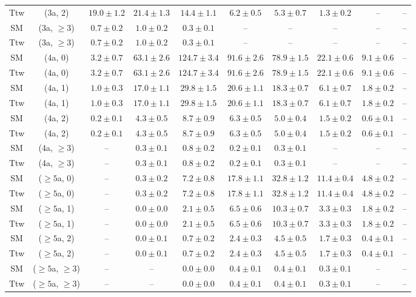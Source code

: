 \begin{table}[h!]
{\begin{tabular}{cccccccccc}
	Ttw & (3a, 2) & $19.0\pm 1.2$ & $21.4\pm 1.3$ & $14.4\pm 1.1$ & $6.2\pm 0.5$ & $5.3\pm 0.7$ & $1.3\pm 0.2$ & -- & -- \\[0.5ex] 
	SM & (3a, $\ge3$) & $0.7\pm 0.2$ & $1.0\pm 0.2$ & $0.3\pm 0.1$ & -- & -- & -- & -- & -- \\[0.5ex] 
	Ttw & (3a, $\ge3$) & $0.7\pm 0.2$ & $1.0\pm 0.2$ & $0.3\pm 0.1$ & -- & -- & -- & -- & -- \\[0.5ex] 
	SM & (4a, 0) & $3.2\pm 0.7$ & $63.1\pm 2.6$ & $124.7\pm 3.4$ & $91.6\pm 2.6$ & $78.9\pm 1.5$ & $22.1\pm 0.6$ & $9.1\pm 0.6$ & -- \\[0.5ex] 
	Ttw & (4a, 0) & $3.2\pm 0.7$ & $63.1\pm 2.6$ & $124.7\pm 3.4$ & $91.6\pm 2.6$ & $78.9\pm 1.5$ & $22.1\pm 0.6$ & $9.1\pm 0.6$ & -- \\[0.5ex] 
	SM & (4a, 1) & $1.0\pm 0.3$ & $17.0\pm 1.1$ & $29.8\pm 1.5$ & $20.6\pm 1.1$ & $18.3\pm 0.7$ & $6.1\pm 0.7$ & $1.8\pm 0.2$ & -- \\[0.5ex] 
	Ttw & (4a, 1) & $1.0\pm 0.3$ & $17.0\pm 1.1$ & $29.8\pm 1.5$ & $20.6\pm 1.1$ & $18.3\pm 0.7$ & $6.1\pm 0.7$ & $1.8\pm 0.2$ & -- \\[0.5ex] 
	SM & (4a, 2) & $0.2\pm 0.1$ & $4.3\pm 0.5$ & $8.7\pm 0.9$ & $6.3\pm 0.5$ & $5.0\pm 0.4$ & $1.5\pm 0.2$ & $0.6\pm 0.1$ & -- \\[0.5ex] 
	Ttw & (4a, 2) & $0.2\pm 0.1$ & $4.3\pm 0.5$ & $8.7\pm 0.9$ & $6.3\pm 0.5$ & $5.0\pm 0.4$ & $1.5\pm 0.2$ & $0.6\pm 0.1$ & -- \\[0.5ex] 
	SM & (4a, $\ge3$) & -- & $0.3\pm 0.1$ & $0.8\pm 0.2$ & $0.2\pm 0.1$ & $0.3\pm 0.1$ & -- & -- & -- \\[0.5ex] 
	Ttw & (4a, $\ge3$) & -- & $0.3\pm 0.1$ & $0.8\pm 0.2$ & $0.2\pm 0.1$ & $0.3\pm 0.1$ & -- & -- & -- \\[0.5ex] 
	SM & ($\ge5$a, 0) & -- & $0.3\pm 0.2$ & $7.2\pm 0.8$ & $17.8\pm 1.1$ & $32.8\pm 1.2$ & $11.4\pm 0.4$ & $4.8\pm 0.2$ & -- \\[0.5ex] 
	Ttw & ($\ge5$a, 0) & -- & $0.3\pm 0.2$ & $7.2\pm 0.8$ & $17.8\pm 1.1$ & $32.8\pm 1.2$ & $11.4\pm 0.4$ & $4.8\pm 0.2$ & -- \\[0.5ex] 
	SM & ($\ge5$a, 1) & -- & $0.0\pm 0.0$ & $2.1\pm 0.5$ & $6.5\pm 0.6$ & $10.3\pm 0.7$ & $3.3\pm 0.3$ & $1.8\pm 0.2$ & -- \\[0.5ex] 
	Ttw & ($\ge5$a, 1) & -- & $0.0\pm 0.0$ & $2.1\pm 0.5$ & $6.5\pm 0.6$ & $10.3\pm 0.7$ & $3.3\pm 0.3$ & $1.8\pm 0.2$ & -- \\[0.5ex] 
	SM & ($\ge5$a, 2) & -- & $0.0\pm 0.1$ & $0.7\pm 0.2$ & $2.4\pm 0.3$ & $4.5\pm 0.5$ & $1.7\pm 0.3$ & $0.4\pm 0.1$ & -- \\[0.5ex] 
	Ttw & ($\ge5$a, 2) & -- & $0.0\pm 0.1$ & $0.7\pm 0.2$ & $2.4\pm 0.3$ & $4.5\pm 0.5$ & $1.7\pm 0.3$ & $0.4\pm 0.1$ & -- \\[0.5ex] 
	SM & ($\ge5$a, $\ge3$) & -- & -- & $0.0\pm 0.0$ & $0.4\pm 0.1$ & $0.4\pm 0.1$ & $0.3\pm 0.1$ & -- & -- \\[0.5ex] 
	Ttw & ($\ge5$a, $\ge3$) & -- & -- & $0.0\pm 0.0$ & $0.4\pm 0.1$ & $0.4\pm 0.1$ & $0.3\pm 0.1$ & -- & -- \\[0.5ex] 
	\hline
	\hline
\end{tabular}}
\end{table}
